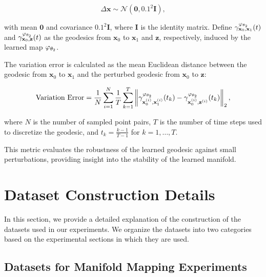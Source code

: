 \[
\Delta\mathbf{x} \sim \mathcal{N}(\mathbf{0}, 0.1^2 \mathbf{I}),
\]

with mean \(\mathbf{0}\) and covariance \(0.1^2 \mathbf{I}\), where \(\mathbf{I}\) is the identity matrix. Define \(\gamma_{\mathbf{x}_0, \mathbf{x}_1}^{\varphi_{\theta_2}}(t)\) and \(\gamma_{\mathbf{x}_0, \mathbf{z}}^{\varphi_{\theta_2}}(t)\) as the geodesics from \(\mathbf{x}_0\) to \(\mathbf{x}_1\) and \(\mathbf{z}\), respectively, induced by the learned map \(\varphi_{\theta_2}\).

The variation error is calculated as the mean Euclidean distance between the geodesic from \(\mathbf{x}_0\) to \(\mathbf{x}_1\) and the perturbed geodesic from \(\mathbf{x}_0\) to \(\mathbf{z}\):

\[
\text{Variation Error} = \frac{1}{N} \sum_{i=1}^{N} \frac{1}{T} \sum_{k=1}^{T} \left\| \gamma_{\mathbf{x}_0^{(i)}, \mathbf{x}_1^{(i)}}^{\varphi_{\theta_2}}(t_k) - \gamma_{\mathbf{x}_0^{(i)}, \mathbf{z}^{(i)}}^{\varphi_{\theta_2}}(t_k) \right\|_2,
\]

where \(N\) is the number of sampled point pairs, \(T\) is the number of time steps used to discretize the geodesic, and \(t_k = \frac{k-1}{T-1}\) for \(k = 1, \dots, T\).

This metric evaluates the robustness of the learned geodesic against small perturbations, providing insight into the stability of the learned manifold.


\section{Dataset Construction Details}
\label{app:dataset_construction}

In this section, we provide a detailed explanation of the construction of the datasets used in our experiments. We organize the datasets into two categories based on the experimental sections in which they are used.

\subsection{Datasets for Manifold Mapping Experiments}
\label{app:manifold_mapping}

